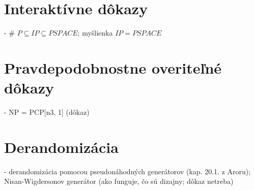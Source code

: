 \documentclass[12pt,a4paper]{article}
\begin{document}
\section{Interaktívne dôkazy}
 - \# $P \subseteq IP \subseteq PSPACE$; myšlienka $IP = PSPACE$
 

\section{Pravdepodobnostne overiteľné dôkazy}
 - NP = PCP[n3, 1] (dôkaz)
 

\section{Derandomizácia} 
- derandomizácia pomocou pseudonáhodných generátorov (kap. 20.1. z Aroru); Nisan-Wigdersonov generátor (ako funguje, čo sú dizajny; dôkaz netreba)
\end{document}

